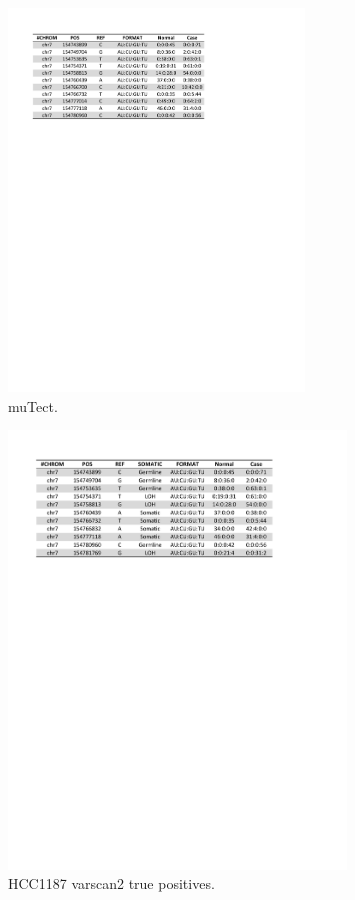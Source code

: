 \documentclass[11pt,reqno]{amsart}
\begin{document}
\begin{figure}[H]
\begin{center}
\includegraphics[width=0.7\textwidth]{pdf_figs/HCC1187_mutect.pdf}
\caption{muTect.}
\label{fig:rd_mutect}
\end{center}
\end{figure}

\begin{figure}[H]
\begin{center}
\includegraphics[width=0.8\textwidth]{pdf_figs/HCC1187_varscan2_true_positives.pdf}
\caption{HCC1187 varscan2 true positives.}
\label{fig:rd_varscan2_TP}
\end{center}
\end{figure}
\end{document}
